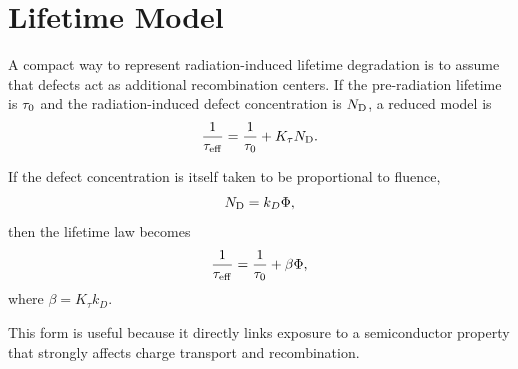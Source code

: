 \documentclass[../../project_master.tex]{subfiles}
\begin{document}
\section{Lifetime Model}
A compact way to represent radiation-induced lifetime degradation is to assume that defects act as additional recombination centers. If the pre-radiation lifetime is $\tau_0$ and the radiation-induced defect concentration is $N_\mathrm{D}$, a reduced model is
\begin{equation}
\frac{1}{\tau_\mathrm{eff}} = \frac{1}{\tau_0} + K_\tau N_\mathrm{D}.
\end{equation}

If the defect concentration is itself taken to be proportional to fluence,
\begin{equation}
N_\mathrm{D} = k_D \Phi,
\end{equation}
then the lifetime law becomes
\begin{equation}
\frac{1}{\tau_\mathrm{eff}} = \frac{1}{\tau_0} + \beta \Phi,
\end{equation}
where $\beta = K_\tau k_D$.

This form is useful because it directly links exposure to a semiconductor property that strongly affects charge transport and recombination.
\end{document}
